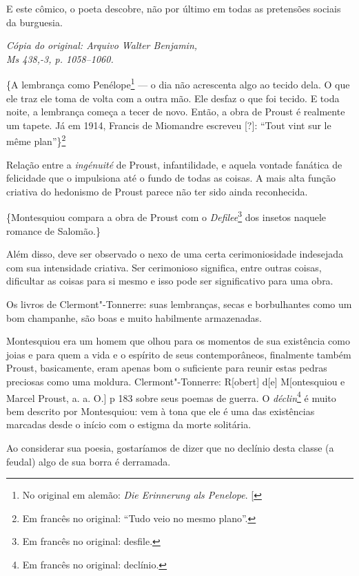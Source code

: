 E este cômico, o poeta descobre, não por último em todas as pretensões
sociais da burguesia.

\begin{flushright}
\emph{\footnotesize{Cópia do original: Arquivo Walter Benjamin,\\ Ms 438,-3, p. 1058--1060.}}
\end{flushright}

\{A lembrança como Penélope\footnote{No original em alemão: \emph{Die Erinnerung als Penelope}. {[}\versal{N.~T.}{]}} --- o dia não acrescenta algo ao tecido dela.
O que ele traz ele toma de volta com a outra mão. Ele desfaz
o que foi tecido. E toda noite, a lembrança começa a tecer de novo.
Então, a obra de Proust é realmente um tapete. Já em 1914, Francis de
Miomandre escreveu {[}?{]}: ``Tout vint sur le même plan''\}\footnote{Em francês no original: ``Tudo veio no mesmo plano''. \versal{[N.~T.]}}

Relação entre a \emph{ingénuité} de Proust, infantilidade, e aquela
vontade fanática de felicidade que o impulsiona até o fundo de
todas as coisas. A mais alta função criativa do hedonismo de Proust
parece não ter sido ainda reconhecida.

\{Montesquiou compara a obra de Proust com o \emph{Defilee}\footnote{Em francês no original: desfile. \versal{[N.~T.]}} dos insetos naquele romance de
Salomão.\}

Além disso, deve ser observado o nexo de uma certa cerimoniosidade
indesejada com sua intensidade criativa. Ser cerimonioso significa,
entre outras coisas, dificultar as coisas para si mesmo e isso pode ser
significativo para uma obra.

Os livros de Clermont"-Tonnerre: suas lembranças, secas e borbulhantes
como um bom champanhe, são boas e muito habilmente armazenadas.

Montesquiou era um homem que olhou para os momentos de sua existência
como joias e para quem a vida e o espírito de seus contemporâneos,
finalmente também Proust, basicamente, eram apenas bom o suficiente para
reunir estas pedras preciosas como uma moldura. Clermont"-Tonnerre: R{[}obert{]} d{[}e{]} M{[}ontesquiou e Marcel Proust, a. a. O.{]} p
183 sobre seus poemas de guerra. O \emph{déclin}\footnote{Em francês no original: declínio. \versal{[N.~T.]}} é muito bem descrito por
Montesquiou: vem à tona que ele é uma das existências marcadas desde o
início com o estigma da morte solitária.

Ao considerar sua poesia, gostaríamos de dizer que no declínio desta
classe (a feudal) algo de sua borra é derramada.


